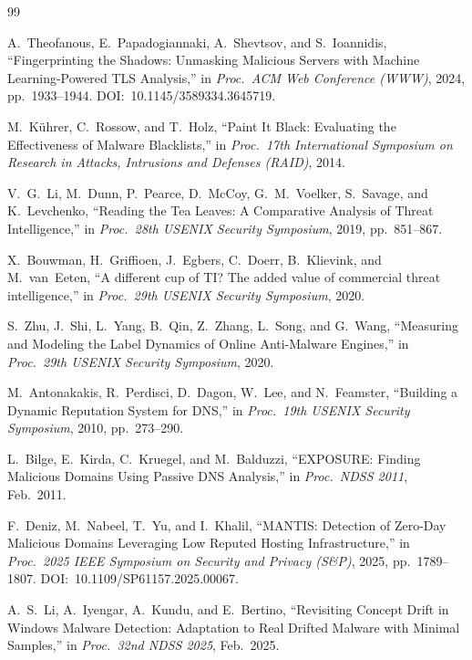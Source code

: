 \begin{thebibliography}{99}

A.~Theofanous, E.~Papadogiannaki, A.~Shevtsov, and S.~Ioannidis,
``Fingerprinting the Shadows: Unmasking Malicious Servers with Machine Learning-Powered TLS Analysis,''
in \textit{Proc.\ ACM Web Conference (WWW)}, 2024, pp.\ 1933--1944.
DOI:~10.1145/3589334.3645719.

M.~Kührer, C.~Rossow, and T.~Holz,
``Paint It Black: Evaluating the Effectiveness of Malware Blacklists,''
in \textit{Proc.\ 17th International Symposium on Research in Attacks, Intrusions and Defenses
(RAID)}, 2014.

V.~G.~Li, M.~Dunn, P.~Pearce, D.~McCoy, G.~M.~Voelker, S.~Savage, and K.~Levchenko,
``Reading the Tea Leaves: A Comparative Analysis of Threat Intelligence,''
in \textit{Proc.\ 28th USENIX Security Symposium}, 2019, pp.\ 851--867.

X.~Bouwman, H.~Griffioen, J.~Egbers, C.~Doerr, B.~Klievink, and M.~van~Eeten,
``A different cup of TI? The added value of commercial threat intelligence,''
in \textit{Proc.\ 29th USENIX Security Symposium}, 2020.

S.~Zhu, J.~Shi, L.~Yang, B.~Qin, Z.~Zhang, L.~Song, and G.~Wang,
``Measuring and Modeling the Label Dynamics of Online Anti-Malware Engines,''
in \textit{Proc.\ 29th USENIX Security Symposium}, 2020.

M.~Antonakakis, R.~Perdisci, D.~Dagon, W.~Lee, and N.~Feamster,
``Building a Dynamic Reputation System for DNS,''
in \textit{Proc.\ 19th USENIX Security Symposium}, 2010, pp.\ 273--290.

L.~Bilge, E.~Kirda, C.~Kruegel, and M.~Balduzzi,
``EXPOSURE: Finding Malicious Domains Using Passive DNS Analysis,''
in \textit{Proc.\ NDSS 2011}, Feb.\ 2011.

F.~Deniz, M.~Nabeel, T.~Yu, and I.~Khalil,
``MANTIS: Detection of Zero-Day Malicious Domains Leveraging Low Reputed Hosting Infrastructure,''
in \textit{Proc.\ 2025 IEEE Symposium on Security and Privacy (S\&P)}, 2025, pp.\ 1789--1807.
DOI:~10.1109/SP61157.2025.00067.

A.~S.~Li, A.~Iyengar, A.~Kundu, and E.~Bertino,
``Revisiting Concept Drift in Windows Malware Detection: Adaptation to Real Drifted Malware with Minimal Samples,''
in \textit{Proc.\ 32nd NDSS 2025}, Feb.\ 2025.


\end{thebibliography}
